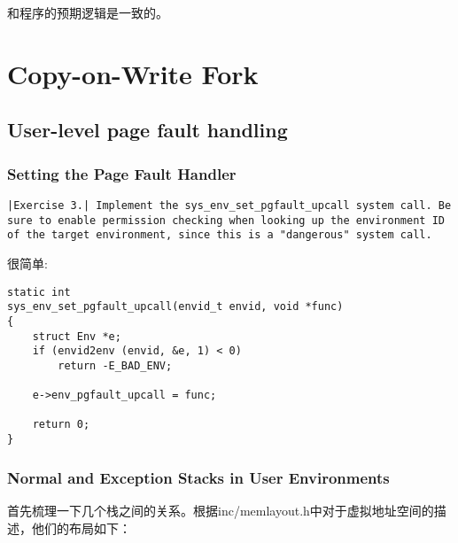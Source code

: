 \documentclass{article}
\begin{document}
\begin{CJK*}{UTF8}{gkai}
和程序的预期逻辑是一致的。


\section{Copy-on-Write Fork}

\subsection{User-level page fault handling}

\subsubsection{Setting the Page Fault Handler}

\begin{lstlisting}[style=exercise]
|Exercise 3.| Implement the sys_env_set_pgfault_upcall system call. Be sure to enable permission checking when looking up the environment ID of the target environment, since this is a "dangerous" system call.
\end{lstlisting}

很简单:

\begin{lstlisting}[style=ccode, title={\scriptsize \ttfamily \bfseries kern/syscall.c: sys\_env\_set\_pgfault\_upcall()}]
static int
sys_env_set_pgfault_upcall(envid_t envid, void *func)
{
    struct Env *e;
    if (envid2env (envid, &e, 1) < 0)
        return -E_BAD_ENV;

    e->env_pgfault_upcall = func;

    return 0;
}
\end{lstlisting}


\subsubsection{Normal and Exception Stacks in User Environments}

首先梳理一下几个栈之间的关系。根据inc/memlayout.h中对于虚拟地址空间的描述，他们的布局如下：


\end{CJK*}
\end{document}
